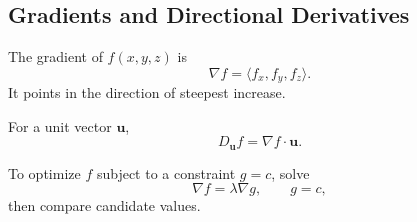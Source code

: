 \subsection*{Gradients and Directional Derivatives}

\begin{definition*}[Gradient]
The gradient of \(f(x,y,z)\) is
\[
  \nabla f=\langle f_x,f_y,f_z\rangle.
\]
It points in the direction of steepest increase.
\end{definition*}

\begin{definition*}
For a unit vector \(\mathbf u\),
\[
  D_{\mathbf u}f=\nabla f\cdot \mathbf u.
\]
\end{definition*}

\begin{remark*}
To optimize \(f\) subject to a constraint \(g=c\), solve
\[
  \nabla f=\lambda \nabla g,\qquad g=c,
\]
then compare candidate values.
\end{remark*}
